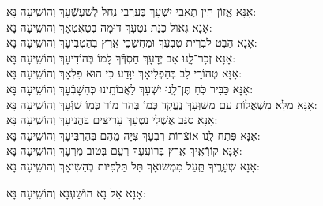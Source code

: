 \documentclass[twoside, openany, parskip=half, 11pt]{book}
\begin{document}
\begin{small}
אָנָּא 	אֱזוֹן חִין תְּאֵבֵי יִשְׁעָךְ בְּעַרְבֵי נַֽחַל לְשַׁעְשְֿׁעָךְ 		\hfill		וְהוֹשִֽׁיעָה נָּא:\\
אָנָּא 	גְּאוֹל כַּנַּת נִטְעָךְ דּוּמָה בְּטַאְטְֿאָךְ 			\hfill		וְהוֹשִֽׁיעָה נָּא:\\
אָנָּא הַבֵּט לִבְרִית טִבְעָךְ וּמַחֲשַׁכֵּי אֶֽרֶץ בְּהַטְבִּיעָךְ 	\hfill		וְהוֹשִֽׁיעָה נָּא:\\
אָנָּא 	זְכָר־לָֽנוּ אָב יְדָעָךְ חַסְדְּֿךָ לָֽמוֹ בְּהוֹדִיעָךְ 		\hfill		וְהוֹשִֽׁיעָה נָּא:\\
אָנָּא 	טְהוֹרֵי לֵב בְּהַפְלִיאָךְ יִוָּדַע כִּי הוּא פִלְאָךְ 		\hfill		וְהוֹשִֽׁיעָה נָּא:\\
אָנָּא 	כַּבִּיר כֹּֽחַ תֶּן־לָֽנוּ יִשְׁעָךְ לַאֲבוֹתֵֽינוּ כְּהִשָּׁבְֿעָךְ 		\hfill		וְהוֹשִֽׁיעָה נָּא:\\
אָנָּא 	מַלֵּא מִשְׁאֲלוֹת עַם מְשַׁוְּעָךְ נֶעֱקָד כְּמוֹ בְּהַר מוֹר כְּמוֹ שִׁוְּֿעָךְ \hfill		וְהוֹשִֽׁיעָה נָּא:\\
אָנָּא 	סַגֵּב אֶשְׁלֵי נִטְעָךְ עָרִיצִים בַּהֲנִיעָךְ 			\hfill		וְהוֹשִֽׁיעָה נָּא:\\
אָנָּא 	פְּתַח לָֽנוּ אוֹצְֿרוֹת רִבְעָךְ צִיָּה מֵהֶם בְּהַרְבִּיעָךְ 	\hfill		וְהוֹשִֽׁיעָה נָּא:\\
אָנָּא 	קוֹרְֿאֶֽיךָ אֶֽרֶץ בְּרוֹעֲעָךְ רְעֵם בְּטוּב מִרְעָךְ 		\hfill		וְהוֹשִֽׁיעָה נָּא:\\
אָנָּא 	שְׁעָרֶֽיךָ תַּֽעַל מִמְּֿשׁוֹאָךְ תֵּל תַּלְפִּיּוֹת בְּהַשִּׂיאָךְ 	\hfill		וְהוֹשִֽׁיעָה נָּא:

\end{small}

\begin{large}
\shatzvkahal
 אָנָּא אֵל נָא הוֹשַׁעְנָא וְהוֹשִֽׁיעָה נָּא:

\end{large}
\end{document}

